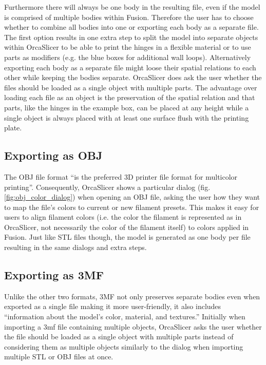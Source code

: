 Furthermore there will always be one body in the resulting file, even if the model is comprised of multiple bodies within Fusion. 
Therefore the user has to choose whether to combine all bodies into one or exporting each body as a separate file.
The first option results in one extra step to split the model into separate objects within OrcaSlicer to be able to print the hinges in a flexible material or to use parts as modifiers (e.g. the blue boxes for additional wall loops). 
Alternatively exporting each body as a separate file might loose their spatial relations to each other while keeping the bodies separate.
OrcaSlicer does ask the user whether the files should be loaded as a single object with multiple parts. 
The advantage over loading each file as an object is the preservation of the spatial relation and that parts, like the hinges in the example box, can be placed at any height while a single object is always placed with at least one surface flush with the printing plate. 

\subsection{Exporting as OBJ}

The OBJ file format ``is the preferred 3D printer file format for multicolor printing''.\cite{iancu_about_2018}
Consequently, OrcaSlicer shows a particular dialog (fig. \ref{fig:obj_color_dialog}) when opening an OBJ file, asking the user how they want to map the file's colors to current or new filament presets.
This makes it easy for users to align filament colors (i.e. the color the filament is represented as in OrcaSlicer, not necessarily the color of the filament itself) to colors applied in Fusion.
Just like STL files though, the model is generated as one body per file resulting in the same dialogs and extra steps.

\subsection{Exporting as 3MF}

Unlike the other two formats, 3MF not only preserves separate bodies even when exported as a single file making it more user-friendly, it also includes ``information about the model’s color, material, and textures.''\cite{iancu_about_2018}
Initially when importing a 3mf file containing multiple objects, OrcaSlicer asks the user whether the file should be loaded as a single object with multiple parts instead of considering them as multiple objects similarly to the dialog when importing multiple STL or OBJ files at once.

